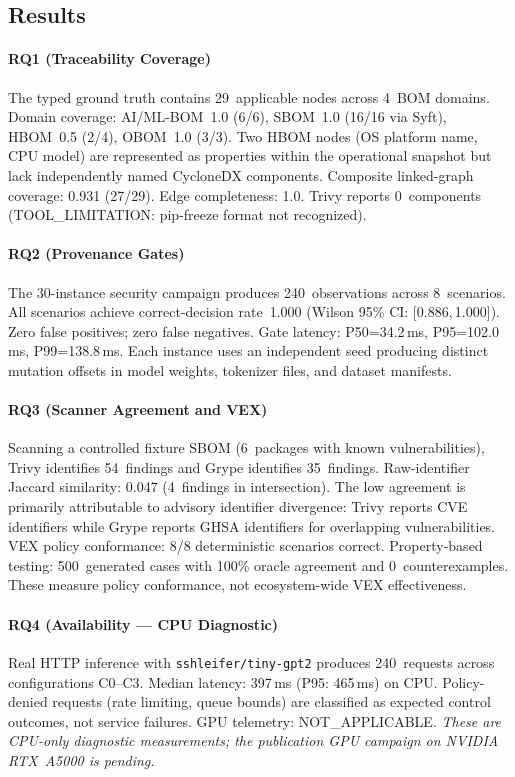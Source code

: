 \subsection{Results}

\paragraph{RQ1 (Traceability Coverage)}
The typed ground truth contains 29~applicable nodes across 4~BOM domains. Domain coverage: AI/ML-BOM~1.0 (6/6), SBOM~1.0 (16/16 via Syft), HBOM~0.5 (2/4), OBOM~1.0 (3/3). Two HBOM nodes (OS platform name, CPU model) are represented as properties within the operational snapshot but lack independently named CycloneDX components. Composite linked-graph coverage: 0.931 (27/29). Edge completeness: 1.0. Trivy reports 0~components (TOOL\_LIMITATION: pip-freeze format not recognized).

\paragraph{RQ2 (Provenance Gates)}
The 30-instance security campaign produces 240~observations across 8~scenarios. All scenarios achieve correct-decision rate~1.000 (Wilson 95\% CI: [0.886,\,1.000]). Zero false positives; zero false negatives. Gate latency: P50=34.2\,ms, P95=102.0\,ms, P99=138.8\,ms. Each instance uses an independent seed producing distinct mutation offsets in model weights, tokenizer files, and dataset manifests.

\paragraph{RQ3 (Scanner Agreement and VEX)}
Scanning a controlled fixture SBOM (6~packages with known vulnerabilities), Trivy identifies 54~findings and Grype identifies 35~findings. Raw-identifier Jaccard similarity: 0.047 (4~findings in intersection). The low agreement is primarily attributable to advisory identifier divergence: Trivy reports CVE identifiers while Grype reports GHSA identifiers for overlapping vulnerabilities. VEX policy conformance: 8/8 deterministic scenarios correct. Property-based testing: 500~generated cases with 100\% oracle agreement and 0~counterexamples. These measure policy conformance, not ecosystem-wide VEX effectiveness.

\paragraph{RQ4 (Availability --- CPU Diagnostic)}
Real HTTP inference with \texttt{sshleifer/tiny-gpt2} produces 240~requests across configurations C0--C3. Median latency: 397\,ms (P95: 465\,ms) on CPU. Policy-denied requests (rate limiting, queue bounds) are classified as expected control outcomes, not service failures. GPU telemetry: NOT\_APPLICABLE. \textit{These are CPU-only diagnostic measurements; the publication GPU campaign on NVIDIA RTX~A5000 is pending.}